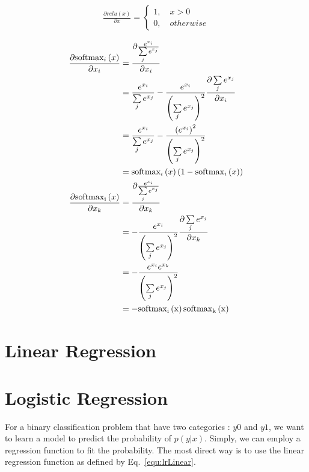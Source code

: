 \documentclass[runningheads,openany]{xhlPaper}
\begin{document}
\begin{equation}
\label{equ:mlp_activate_function_relu_derivative}
\begin{aligned}
\frac{{\partial relu\left( x \right)}}{{\partial x}} = \left\{ {\begin{array}{*{20}{l}}
{1,\quad x > 0}\\
{0,\quad otherwise}
\end{array}} \right.
\end{aligned}
\end{equation}

\begin{equation}
\label{equ:mlp_activate_function_softmax_derivative}
\begin{aligned}
\frac{{\partial {\rm{softma}}{{\rm{x}}_i}\left( x \right)}}{{\partial {x_i}}} &= \frac{{\partial \frac{{{e^{{x_i}}}}}{{\sum\limits_j {{e^{{x_j}}}} }}}}{{\partial {x_i}}}\\
 &= \frac{{{e^{{x_i}}}}}{{\sum\limits_j {{e^{{x_j}}}} }} - \frac{{{e^{{x_i}}}}}{{{{\left( {\sum\limits_j {{e^{{x_j}}}} } \right)}^2}}}\frac{{\partial \sum\limits_j {{e^{{x_j}}}} }}{{\partial {x_i}}}\\
 &= \frac{{{e^{{x_i}}}}}{{\sum\limits_j {{e^{{x_j}}}} }} - \frac{{{{\left( {{e^{{x_i}}}} \right)}^2}}}{{{{\left( {\sum\limits_j {{e^{{x_j}}}} } \right)}^2}}}\\
 &= {\rm{softma}}{{\rm{x}}_i}\left( x \right)\left( {1 - {\rm{softma}}{{\rm{x}}_i}\left( x \right)} \right)\\
 \frac{{\partial {\rm{softmax}_i}\left( x \right)}}{{\partial {x_k}}} &= \frac{{\partial \frac{{{e^{{x_i}}}}}{{\sum\limits_j {{e^{{x_j}}}} }}}}{{\partial {x_k}}}\\
 &= - \frac{{{e^{{x_i}}}}}{{{{\left( {\sum\limits_j {{e^{{x_j}}}} } \right)}^2}}}\frac{{\partial \sum\limits_j {{e^{{x_j}}}} }}{{\partial {x_k}}}\\
 &= - \frac{{ e^{x_i} e^{x_k}}}{{{{\left( {\sum\limits_j {{e^{{x_j}}}} } \right)}^2}}}\\
 &= -\rm{softmax}_{i}\left ( x \right )\rm{softmax}_k\left ( x \right )\\
\end{aligned}
\end{equation}

\section{Linear Regression}

\section{Logistic Regression}
For a binary classification problem that have two categories : $y0$ and $y1$, we want to learn a model to predict the probability of $p\left(y|x\right)$. 
Simply, we can employ a regression function to fit the probability. The most direct way is to use the linear regression function as defined by Eq.~\ref{equ:lrLinear}.
\end{document}
